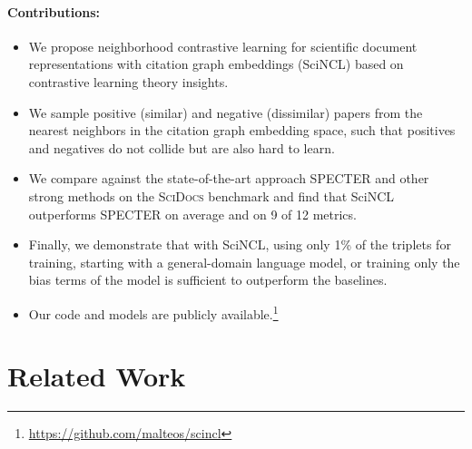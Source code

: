 \documentclass[11pt]{article}
\newcommand{\dataset}{\textsc{SciDocs}\xspace}
\newcommand{\sys}{SciNCL\xspace} \newcommand{\baselineCount}{10\xspace}
\begin{document}
\paragraph{Contributions:}
\begin{itemize}[noitemsep]
\item {We propose neighborhood contrastive learning for scientific document representations with citation graph embeddings (\sys)  based on contrastive learning theory insights.} \item {We sample positive (similar) and negative (dissimilar) papers from the  nearest neighbors in the citation graph embedding space, such that positives and negatives do not collide but are also hard to learn.}
\item{We compare against the state-of-the-art approach SPECTER \cite{Cohan2020} and other strong methods on the \dataset benchmark and find that \sys outperforms SPECTER on average and on 9 of 12 metrics.} 
\item{Finally, we demonstrate that with \sys, using only 1\% of the triplets for training, starting with a general-domain language model, or training only the bias terms of the model is sufficient to outperform the baselines.}
\item{Our code and models are publicly available.\footnote{\label{fn:github} \url{https://github.com/malteos/scincl}}} \end{itemize}


\section{Related Work} \label{sec:related-work}
\end{document}
